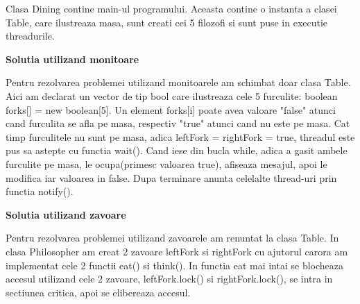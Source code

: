 \documentclass{article}
\begin{document}
\hspace{0.5 cm}
Clasa Dining contine main-ul programului. Aceasta contine o instanta a clasei Table, care ilustreaza masa, sunt creati cei 5 filozofi si sunt puse in executie threadurile.

\vspace{5mm}
\hspace{0.5 cm}
{\large \textbf {Solutia utilizand monitoare}}

\hspace{0.5 cm}
Pentru rezolvarea problemei utilizand monitoarele am schimbat doar clasa Table. Aici am declarat un vector de tip bool care ilustreaza cele 5 furculite: boolean forks[] = new boolean[5]. Un element forks[i] poate avea valoare "false" atunci cand furculita se afla pe masa, respectiv "true" atunci cand nu este pe masa. Cat timp furculitele nu sunt pe masa, adica leftFork = rightFork = true, threadul este pus sa astepte cu functia wait().
Cand iese din bucla while, adica a gasit ambele furculite pe masa, le ocupa(primesc valoarea true), afiseaza mesajul, apoi le modifica iar valoarea in false. Dupa terminare anunta celelalte thread-uri prin functia notify().

\vspace{5mm}
\hspace{0.5 cm}
{\large \textbf {Solutia utilizand zavoare}}

\hspace{0.5 cm}
Pentru rezolvarea problemei utilizand zavoarele am renuntat la clasa Table. In clasa Philosopher am creat 2 zavoare leftFork si rightFork cu ajutorul carora am implementat cele 2 functii eat() si think(). In functia eat mai intai se blocheaza accesul utilizand cele 2 zavoare, leftFork.lock() si rightFork.lock(), se intra in sectiunea critica, apoi se elibereaza accesul.
\end{document}
